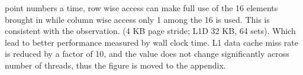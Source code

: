 \documentclass[9pt]{extarticle}
\begin{document}
point numbers a time, row wise access can make full use of the 16 elements brought in while column wise access only 1 among the 16 is
used. This is consistent with the observation. 
(4 KB page stride; L1D 32 KB, 64 sets).
Which lead to better performance measured by wall clock time. L1 data cache miss rate is reduced by a factor of 10, and the value 
does not change significantly across number of threads, thus the figure is moved to the appendix.
\par\vspace{1ex}
\begin{minipage}{0.45\linewidth}
  \noindent{}
\end{minipage}\hfill
\begin{minipage}{0.5\linewidth}
  \noindent{}
\end{minipage}\hfill
\end{document}
